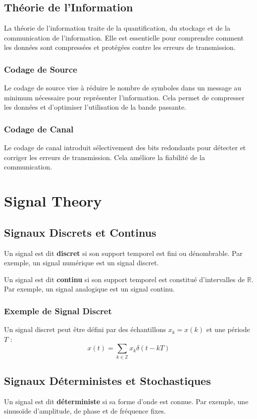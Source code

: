 \documentclass[10pt,a4paper]{article}
\begin{document}
\subsection*{Théorie de l'Information}
La théorie de l'information traite de la quantification, du stockage et de la communication de l'information. Elle est essentielle pour comprendre comment les données sont compressées et protégées contre les erreurs de transmission.

\subsubsection*{Codage de Source}
Le codage de source vise à réduire le nombre de symboles dans un message au minimum nécessaire pour représenter l'information. Cela permet de compresser les données et d'optimiser l'utilisation de la bande passante.

\subsubsection*{Codage de Canal}
Le codage de canal introduit sélectivement des bits redondants pour détecter et corriger les erreurs de transmission. Cela améliore la fiabilité de la communication.

\section*{Signal Theory}

\subsection*{Signaux Discrets et Continus}
Un signal est dit \textbf{discret} si son support temporel est fini ou dénombrable. Par exemple, un signal numérique est un signal discret.

Un signal est dit \textbf{continu} si son support temporel est constitué d'intervalles de $\mathbb{R}$. Par exemple, un signal analogique est un signal continu.

\subsubsection*{Exemple de Signal Discret}
Un signal discret peut être défini par des échantillons $x_k = x(k)$ et une période $T$ :
\[ x(t) = \sum_{k \in \mathbb{Z}} x_k \delta(t - kT) \]

\subsection*{Signaux Déterministes et Stochastiques}
Un signal est dit \textbf{déterministe} si sa forme d'onde est connue. Par exemple, une sinusoïde d'amplitude, de phase et de fréquence fixes.
\end{document}
